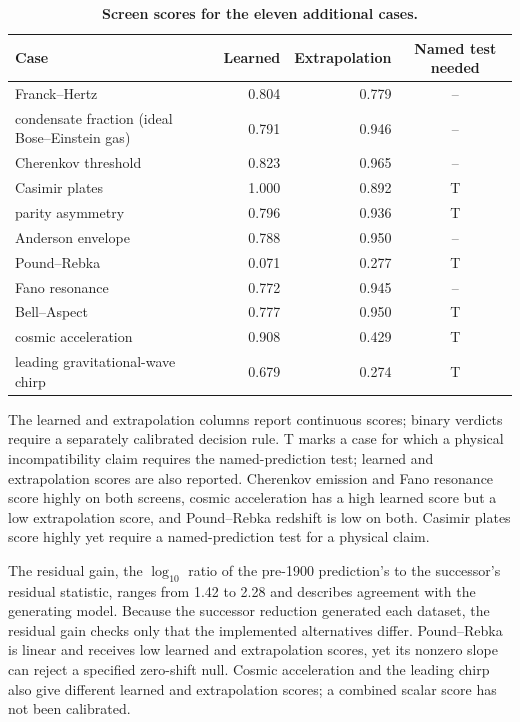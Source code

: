\documentclass{article}
\begin{document}
\begin{table}[htbp]
\centering
\caption{\textbf{Screen scores for the eleven additional cases.}}
\small
\begin{tabular}{@{}lrrc@{}}
\toprule
Case & Learned & Extrapolation & Named test needed \\
\midrule
Franck--Hertz & 0.804 & 0.779 & -- \\
condensate fraction (ideal Bose--Einstein gas) & 0.791 & 0.946 & -- \\
Cherenkov threshold & 0.823 & 0.965 & -- \\
Casimir plates & 1.000 & 0.892 & T \\
parity asymmetry & 0.796 & 0.936 & T \\
Anderson envelope & 0.788 & 0.950 & -- \\
Pound--Rebka & 0.071 & 0.277 & T \\
Fano resonance & 0.772 & 0.945 & -- \\
Bell--Aspect & 0.777 & 0.950 & T \\
cosmic acceleration & 0.908 & 0.429 & T \\
leading gravitational-wave chirp & 0.679 & 0.274 & T \\
\bottomrule
\end{tabular}
\end{table}

The learned and extrapolation columns report continuous scores; binary verdicts require a separately calibrated decision rule. T marks a case for which a physical incompatibility claim requires the named-prediction test; learned and extrapolation scores are also reported. Cherenkov emission and Fano resonance score highly on both screens, cosmic acceleration has a high learned score but a low extrapolation score, and Pound--Rebka redshift is low on both. Casimir plates score highly yet require a named-prediction test for a physical claim.

The residual gain, the $\log_{10}$ ratio of the pre-1900 prediction's to the successor's residual statistic, ranges from 1.42 to 2.28 and describes agreement with the generating model. Because the successor reduction generated each dataset, the residual gain checks only that the implemented alternatives differ. Pound--Rebka is linear and receives low learned and extrapolation scores, yet its nonzero slope can reject a specified zero-shift null. Cosmic acceleration and the leading chirp also give different learned and extrapolation scores; a combined scalar score has not been calibrated.
\end{document}
